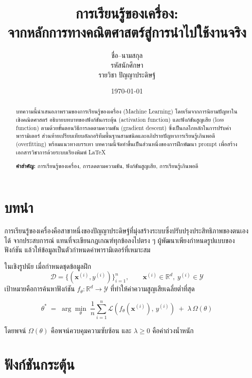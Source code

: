 \documentclass[12pt, a4paper]{article}
\title{\textbf{การเรียนรู้ของเครื่อง:\\ จากหลักการทางคณิตศาสตร์สู่การนำไปใช้งานจริง}}
\author{ชื่อ--นามสกุล \\ รหัสนักศึกษา \\ รายวิชา ปัญญาประดิษฐ์}
\date{\today}
\begin{document}
\maketitle

\begin{abstract}
\noindent
บทความนี้นำเสนอภาพรวมของการเรียนรู้ของเครื่อง (Machine Learning) โดยเริ่มจากการนิยามปัญหาในเชิงคณิตศาสตร์
อธิบายบทบาทของฟังก์ชันกระตุ้น (activation function) และฟังก์ชันสูญเสีย (loss function)
ตามด้วยขั้นตอนวิธีการลดตามความชัน (gradient descent) ซึ่งเป็นกลไกหลักในการปรับค่าพารามิเตอร์
ส่วนท้ายเปรียบเทียบอัลกอริทึมพื้นฐานสามชนิดและอภิปรายปัญหาการเรียนรู้เกินพอดี (overfitting)
พร้อมแนวทางบรรเทา บทความนี้จัดทำขึ้นเป็นส่วนหนึ่งของการฝึกพัฒนา prompt
เพื่อสร้างเอกสารวิชาการด้วยระบบเรียงพิมพ์ \LaTeX{}

\vspace{0.5em}
\noindent\textbf{คำสำคัญ:} การเรียนรู้ของเครื่อง, การลดตามความชัน, ฟังก์ชันสูญเสีย, การเรียนรู้เกินพอดี
\end{abstract}

\section{บทนำ}

การเรียนรู้ของเครื่องคือสาขาหนึ่งของปัญญาประดิษฐ์ที่มุ่งสร้างระบบซึ่งปรับปรุงประสิทธิภาพของตนเองได้
จากประสบการณ์ แทนที่จะเขียนกฎเกณฑ์ทุกข้อลงไปตรง ๆ ผู้พัฒนาเพียงกำหนดรูปแบบของฟังก์ชัน
แล้วให้ข้อมูลเป็นตัวกำหนดค่าพารามิเตอร์ที่เหมาะสม

ในเชิงรูปนัย เมื่อกำหนดชุดข้อมูลฝึก
\[
  \mathcal{D} = \{(\mathbf{x}^{(i)}, y^{(i)})\}_{i=1}^{n},
  \qquad \mathbf{x}^{(i)} \in \mathbb{R}^{d},\ y^{(i)} \in \mathcal{Y}
\]
เป้าหมายคือการค้นหาฟังก์ชัน $f_{\theta} : \mathbb{R}^{d} \to \mathcal{Y}$
ที่ทำให้ค่าความสูญเสียเฉลี่ยต่ำที่สุด

\begin{equation}
  \theta^{*} \;=\; \arg\min_{\theta}\;
  \frac{1}{n}\sum_{i=1}^{n} \mathcal{L}\!\left(f_{\theta}(\mathbf{x}^{(i)}),\, y^{(i)}\right)
  \;+\; \lambda\,\Omega(\theta)
  \label{eq:erm}
\end{equation}

โดยพจน์ $\Omega(\theta)$ คือพจน์ควบคุมความซับซ้อน และ $\lambda \ge 0$ คือค่าถ่วงน้ำหนัก

\section{ฟังก์ชันกระตุ้น}
\end{document}
